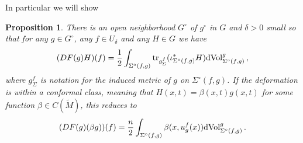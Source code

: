 \documentclass[11pt]{amsart}
\newtheorem{Proposition}[Theorem]{Proposition}
\theoremstyle{definition}
\numberwithin{equation}{section}
\begin{document}
In particular we will show
\begin{Proposition}\label{prop:diffF}
	There is an open neighborhood $G^\circ$ of $g^\circ$ in $G$ and $\delta>0$ small so that for any $g\in G^\circ$, any $f\in U_\delta$ and any $H\in G$ we have
	\begin{equation}\label{eq: differential of area functional}
		(DF(g)H)(f) =  \frac{1}{2} \int_{\Sigma^\circ(f,g)} \mathrm{tr}_{g^f_\Sigma}( \iota_{\Sigma^\circ(f,g)}^* H)
{\rm dVol}^{g}_{\Sigma^\circ(f,g)}\,,
	\end{equation}
	where $g^f_\Sigma$ is notation for the induced metric of $g$ on $\Sigma^\circ(f,g)$. If the deformation is within a conformal class, meaning that $H(x,t) = \beta(x,t) g(x,t)$ for some function $\beta\in C(\widetilde{M})$, this reduces to 
\begin{eqnarray}
\label{eq: minimal surface transform}
(DF(g)(\beta g))(f) = \frac{n}{2} \int_{\Sigma^\circ(f,g)} \beta(x,u^f_{g}(x)) {\rm dVol}^{g}_{\Sigma^\circ(f,g)}\,.
\end{eqnarray}
\end{Proposition}
\end{document}

